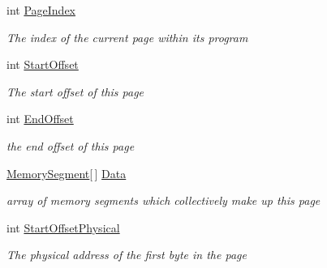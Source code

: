 \begin{DoxyCompactItemize}
\item 
int \hyperlink{class_c_p_u___o_s___simulator_1_1_memory_1_1_memory_page_aec80700d036a447e7e6ec204513e3a59}{Page\+Index}
\begin{DoxyCompactList}\small\item\em The index of the current page within its program \end{DoxyCompactList}\item 
int \hyperlink{class_c_p_u___o_s___simulator_1_1_memory_1_1_memory_page_ad700979e51dd3d05470c681588c6fa79}{Start\+Offset}
\begin{DoxyCompactList}\small\item\em The start offset of this page \end{DoxyCompactList}\item 
int \hyperlink{class_c_p_u___o_s___simulator_1_1_memory_1_1_memory_page_abe850b4a088a820ecf598af1cd9a7deb}{End\+Offset}
\begin{DoxyCompactList}\small\item\em the end offset of this page \end{DoxyCompactList}\item 
\hyperlink{class_c_p_u___o_s___simulator_1_1_memory_1_1_memory_segment}{Memory\+Segment}\mbox{[}$\,$\mbox{]} \hyperlink{class_c_p_u___o_s___simulator_1_1_memory_1_1_memory_page_a8bf84e82146f9ff35ffbcc32b93a9db0}{Data}
\begin{DoxyCompactList}\small\item\em array of memory segments which collectively make up this page \end{DoxyCompactList}\item 
int \hyperlink{class_c_p_u___o_s___simulator_1_1_memory_1_1_memory_page_af31a2243a3e68ec635315929859fa358}{Start\+Offset\+Physical}
\begin{DoxyCompactList}\small\item\em The physical address of the first byte in the page \end{DoxyCompactList}\item 

\end{DoxyCompactItemize}
